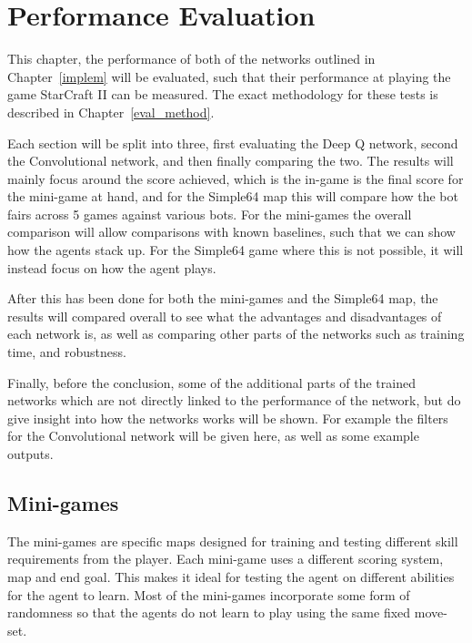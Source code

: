 \chapter{Performance Evaluation}%
\label{eval}

This chapter, the performance of both of the networks outlined in
Chapter~\ref{implem} will be evaluated, such that their performance at playing
the game StarCraft II can be measured. The exact methodology for these tests is
described in Chapter~\ref{eval_method}.

Each section will be split into three, first evaluating the Deep Q network,
second the Convolutional network, and then finally comparing the two. The
results will mainly focus around the score achieved, which is the in-game is the
final score for the mini-game at hand, and for the Simple64 map this will
compare how the bot fairs across 5 games against various bots. For the
mini-games the overall comparison will allow comparisons with known baselines,
such that we can show how the agents stack up. For the Simple64 game where this
is not possible, it will instead focus on how the agent plays.


After this has been done for both the mini-games and the Simple64 map, the
results will compared overall to see what the advantages and disadvantages of
each network is, as well as comparing other parts of the networks such as
training time, and robustness.

Finally, before the conclusion, some of the additional parts of the trained
networks which are not directly linked to the performance of the network, but
do give insight into how the networks works will be shown. For example the
filters for the Convolutional network will be given here, as well as some
example outputs.

\section{Mini-games}

The mini-games are specific maps designed for training and testing different skill requirements from the player. Each mini-game uses a different scoring system, map and end goal. This makes it ideal for testing the agent on different abilities for the agent to learn. Most of the mini-games incorporate some form of randomness so that the agents do not learn to play using the same fixed move-set.

